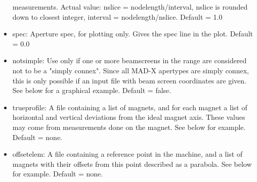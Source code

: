 \begin{itemize}
     measurements. Actual value:  nslice = nodelength/interval, nslice
     is rounded down to closest integer,  interval =
     nodelength/nslice. Default = 1.0  
   \item spec: Aperture spec, for plotting only. Gives the spec line in
     the plot. Default = 0.0  
   \item notsimple: Use only if one or more beamscreens in the range are
     considered not to  be a "simply connex". Since all MAD-X apertypes
     are simply connex, this is only possible  if an input file with
     beam screen coordinates are given. See below for a graphical
     example. Default = false.  
   \item trueprofile: A file containing a list of magnets, and for each
     magnet a list of horizontal and vertical deviations from the ideal
     magnet axis. These values may come from measurements done on the
     magnet. See below for example. Default = none.  
   \item offsetelem: A file containing a reference point in the machine,
     and a list of magnets with their offsets from this point described
     as a parabola. See below for example. Default = none.  
\end{itemize}



